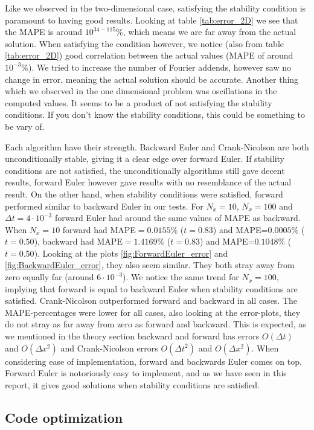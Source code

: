 \documentclass[reprint, english,notitlepage,nofootinbib]{revtex4-1}  %
\begin{document}
Like we observed in the two-dimensional case, satisfying the stability condition is paramount to having good results. Looking at table \ref{tab:error_2D} we see that the MAPE is around $10^{34-115}$\%, which means we are far away from the actual solution. When satisfying the condition however, we notice (also from table \ref{tab:error_2D}) good correlation between the actual values (MAPE of around $10^{-3}$\%). We tried to increase the number of Fourier addends, however saw no change in error, meaning the actual solution should be accurate. Another thing which we observed in the one dimensional problem was oscillations in the computed values. It seems to be a product of not satisfying the stability conditions. If you don't know the stability conditions, this could be something to be vary of.

Each algorithm have their strength. Backward Euler and Crank-Nicolson are both unconditionally stable, giving it a clear edge over forward Euler. If stability conditions are not satisfied, the unconditionally algorithms still gave decent results, forward Euler however gave results with no resemblance of the actual result. On the other hand, when stability conditions were satisfied, forward performed similar to backward Euler in our tests. For $N_x = 10$, $N_x =100$ and $\Delta t = 4\cdot 10^{-3}$ forward Euler had around the same values of MAPE as backward. When $N_x = 10$ forward had MAPE$=0.0155\%$ ($t = 0.83$) and MAPE=$0.0005\%$ ($t=0.50$), backward had MAPE$=1.4169\%$ ($t = 0.83$) and MAPE=$0.1048\%$ ($t=0.50$). Looking at the plots \ref{fig:ForwardEuler_error} and \ref{fig:BackwardEuler_error}, they also seem similar. They both stray away from zero equally far (around $6\cdot10^{-3}$). We notice the same trend for $N_x = 100$, implying that forward is equal to backward Euler when stability conditions are satisfied. Crank-Nicolson outperformed forward and backward in all cases. The MAPE-percentages were lower for all cases, also looking at the error-plots, they do not stray as far away from zero as forward and backward. This is expected, as we mentioned in the theory section backward and forward has errors $O(\Delta t)$ and $O(\Delta x^2)$ and Crank-Nicolson errors $O(\Delta t^2)$ and $O(\Delta x^2)$. When considering ease of implementation, forward and backwards Euler comes on top. Forward Euler is notoriously easy to implement, and as we have seen in this report, it gives good solutions when stability conditions are satisfied.

\subsection*{Code optimization}
\end{document}
